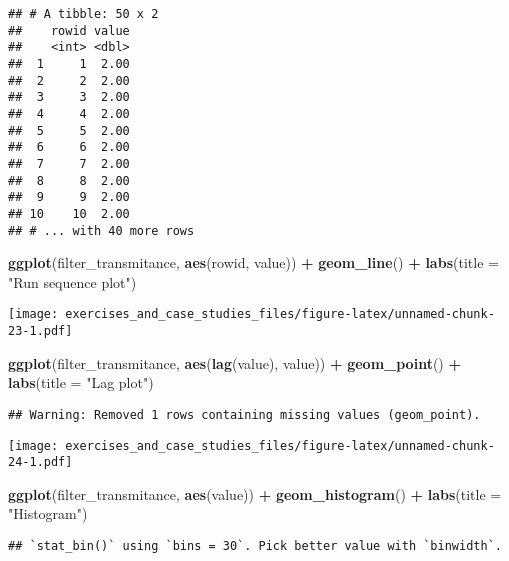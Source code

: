 \documentclass[]{book}
\newenvironment{Shaded}{\begin{snugshade}}{\end{snugshade}}
\newcommand{\DataTypeTok}[1]{\textcolor[rgb]{0.13,0.29,0.53}{#1}}
\newcommand{\KeywordTok}[1]{\textcolor[rgb]{0.13,0.29,0.53}{\textbf{#1}}}
\newcommand{\NormalTok}[1]{#1}
\newcommand{\OperatorTok}[1]{\textcolor[rgb]{0.81,0.36,0.00}{\textbf{#1}}}
\newcommand{\StringTok}[1]{\textcolor[rgb]{0.31,0.60,0.02}{#1}}
\theoremstyle{definition}
\theoremstyle{definition}
\theoremstyle{definition}
\theoremstyle{remark}
\begin{document}
\begin{verbatim}
## # A tibble: 50 x 2
##    rowid value
##    <int> <dbl>
##  1     1  2.00
##  2     2  2.00
##  3     3  2.00
##  4     4  2.00
##  5     5  2.00
##  6     6  2.00
##  7     7  2.00
##  8     8  2.00
##  9     9  2.00
## 10    10  2.00
## # ... with 40 more rows
\end{verbatim}

\begin{Shaded}
\begin{Highlighting}[]
\KeywordTok{ggplot}\NormalTok{(filter_transmitance, }\KeywordTok{aes}\NormalTok{(rowid, value)) }\OperatorTok{+}
\StringTok{  }\KeywordTok{geom_line}\NormalTok{() }\OperatorTok{+}
\StringTok{  }\KeywordTok{labs}\NormalTok{(}\DataTypeTok{title =} \StringTok{"Run sequence plot"}\NormalTok{)}
\end{Highlighting}
\end{Shaded}

\texttt{[image: exercises\_and\_case\_studies\_files/figure-latex/unnamed-chunk-23-1.pdf]}

\begin{Shaded}
\begin{Highlighting}[]
\KeywordTok{ggplot}\NormalTok{(filter_transmitance, }\KeywordTok{aes}\NormalTok{(}\KeywordTok{lag}\NormalTok{(value), value)) }\OperatorTok{+}
\StringTok{  }\KeywordTok{geom_point}\NormalTok{() }\OperatorTok{+}
\StringTok{  }\KeywordTok{labs}\NormalTok{(}\DataTypeTok{title =} \StringTok{"Lag plot"}\NormalTok{)}
\end{Highlighting}
\end{Shaded}

\begin{verbatim}
## Warning: Removed 1 rows containing missing values (geom_point).
\end{verbatim}

\texttt{[image: exercises\_and\_case\_studies\_files/figure-latex/unnamed-chunk-24-1.pdf]}

\begin{Shaded}
\begin{Highlighting}[]
\KeywordTok{ggplot}\NormalTok{(filter_transmitance, }\KeywordTok{aes}\NormalTok{(value)) }\OperatorTok{+}
\StringTok{  }\KeywordTok{geom_histogram}\NormalTok{() }\OperatorTok{+}
\StringTok{  }\KeywordTok{labs}\NormalTok{(}\DataTypeTok{title =} \StringTok{"Histogram"}\NormalTok{)}
\end{Highlighting}
\end{Shaded}

\begin{verbatim}
## `stat_bin()` using `bins = 30`. Pick better value with `binwidth`.
\end{verbatim}
\end{document}

